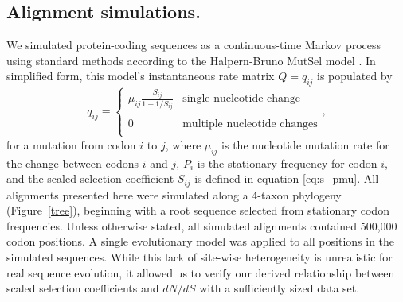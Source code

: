\documentclass[11pt]{article}
\begin{document}
\subsection*{Alignment simulations.}
We simulated protein-coding sequences as a continuous-time Markov process using standard methods \cite{Yang2006} according to the Halpern-Bruno MutSel model \cite{HalpernBruno1998}. In simplified form, this model's instantaneous rate matrix $Q = q_{ij}$ is populated by
\begin{equation}\label{eq:HBmatrix}
q_{ij} = \left\{ 
\begin{array}{rl}
\mu_{ij} \frac{S_{ij}}{1-1/S_{ij}} &\mbox{single nucleotide change} \\\\
0                                  &\mbox{multiple nucleotide changes} \\             
\end{array} \right.,
\end{equation} for a mutation from codon $i$ to $j$, where $\mu_{ij}$ is the nucleotide mutation rate for the change between codons $i$ and $j$, $P_i$ is the stationary frequency for codon $i$, and the scaled selection coefficient $S_{ij}$ is defined in equation \eqref{eq:s_pmu}. All alignments presented here were simulated along a 4-taxon phylogeny (Figure~\ref{tree}), beginning with a root sequence selected from stationary codon frequencies. Unless otherwise stated, all simulated alignments contained 500,000 codon positions. A single evolutionary model was applied to all positions in the simulated sequences. While this lack of site-wise heterogeneity is unrealistic for real sequence evolution, it allowed us to verify our derived relationship between scaled selection coefficients and $dN/dS$ with a sufficiently sized data set.

	
\end{document}
